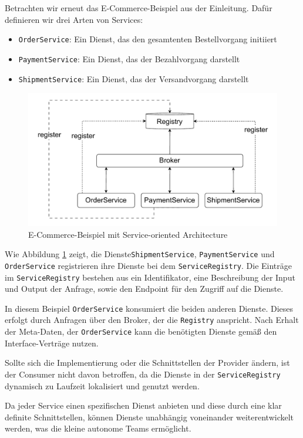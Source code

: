 \documentclass[acmtog]{acmart}
\begin{document}
Betrachten wir erneut das E-Commerce-Beispiel aus der Einleitung.
Dafür definieren wir drei Arten von Services:
\begin{itemize}
  \item \texttt{OrderService}: Ein Dienst, das den gesamtenten Bestellvorgang initiiert
  \item \texttt{PaymentService}: Ein Dienst, das der Bezahlvorgang darstellt
  \item \texttt{ShipmentService}: Ein Dienst, das der Versandvorgang darstellt
\end{itemize}

\begin{figure}[!h]
  \centering
  \includegraphics[width=0.8\linewidth]{images/soa/soa-example.pdf}
  \caption{E-Commerce-Beispiel mit Service-oriented Architecture}
  \label{fig:soaecommerce}
\end{figure}

Wie Abbildung \ref{fig:soaecommerce} zeigt, die Dienste\texttt{ShipmentService},
\texttt{PaymentService} und \texttt{OrderService} registrieren ihre Dienste
bei dem \texttt{ServiceRegistry}.
Die Einträge im \texttt{ServiceRegistry} bestehen aus ein Identifikator,
eine Beschreibung der Input und Output der Anfrage, sowie
den Endpoint für den Zugriff auf die Dienste.

In diesem Beispiel \texttt{OrderService} konsumiert die beiden anderen Dienste.
 Dieses erfolgt durch Anfragen über den Broker, der die \texttt{Registry} anspricht.
Nach Erhalt der Meta-Daten, der \texttt{OrderService} kann die benötigten Dienste
 gemäß den Interface-Verträge nutzen.

Sollte sich die Implementierung oder die Schnittstellen der Provider ändern, ist
der Consumer nicht davon betroffen, da die Dienste in der \texttt{ServiceRegistry}
 dynamisch zu Laufzeit lokalisiert und genutzt werden.

Da jeder Service einen spezifischen Dienst anbieten und diese durch eine
 klar definite Schnittstellen, können Dienste unabhängig voneinander
 weiterentwickelt werden, was die kleine autonome Teams ermöglicht.
\end{document}
